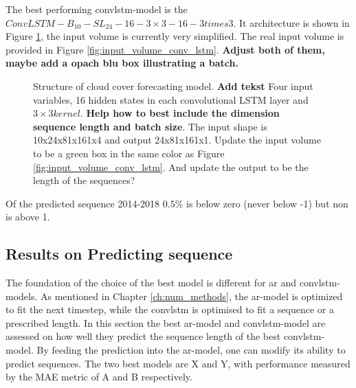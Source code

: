The best performing \acrshort{convlstm}-model is the $ConvLSTM-B_{10}-SL_{24}-16-3\times3-16-3 times3$. It architecture is shown in Figure \ref{fig:best_ml_architecture}, the input volume is currently very simplified. The real input volume is provided in Figure \ref{fig:input_volume_conv_lstm}. \textbf{Adjust both of them, maybe add a opach blu box illustrating a batch. }

\begin{figure}
    \centering
    
    \caption{Structure of cloud cover forecasting model. \textbf{Add tekst} Four input variables, 16 hidden states in each convolutional LSTM layer and $3\times 3 kernel$. \textbf{Help how to best include the dimension sequence length and batch size}. The input shape is 10x24x81x161x4 and output 24x81x161x1. Update the input volume to be a green box in the same color as Figure \ref{fig:input_volume_conv_lstm}. And update the output to be the length of the sequences?}
    \label{fig:best_ml_architecture}
\end{figure}

Of the predicted sequence 2014-2018 $0.5\%$ is below zero (never below -1) but non is above 1. %

\subsection{Results on Predicting sequence}
The foundation of the choice of the best model is different for \acrshort{ar} and \acrshort{convlstm}-models. As mentioned in Chapter \ref{ch:num_methods}, the \acrshort{ar}-model is optimized to fit the next timestep, while the \acrshort{convlstm} is optimised to fit a sequence or a prescribed length. In this section the best \acrshort{ar}-model and \acrshort{convlstm}-model are assessed on how well they predict the sequence length of the best \acrshort{convlstm}-model. By feeding the prediction into the \acrshort{ar}-model, one can modify its ability to predict sequences. The two best models are X and Y, with performance measured by the MAE metric of A and B respectively. 

